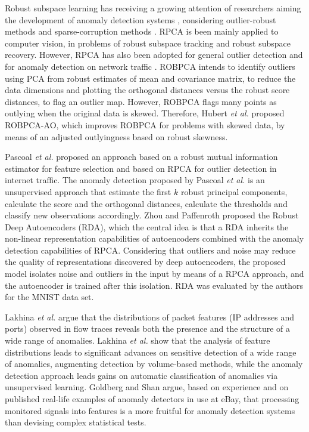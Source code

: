\documentclass[review]{elsarticle}
\begin{document}
Robust subspace learning has receiving a growing attention of researchers aiming the development of anomaly detection systems \cite{rousseeuw1984mcd, rousseeuw1999fastmcd}, considering outlier-robust methods and sparse-corruption methods \cite{lerman2018overview}. RPCA is been mainly applied to computer vision, in problems of robust subspace tracking and robust subspace recovery. However, RPCA has also been adopted for general outlier detection \cite{hubert2005robpca,hubert2009robustskewed,cherapanamjeri2017thresholding,zhou2017anomaly,NetflixSurus} and for anomaly detection on network traffic \cite{pascoal2012robust}. ROBPCA \cite{hubert2005robpca} intends to identify outliers using PCA from robust estimates of mean and covariance matrix, to reduce the data dimensions and plotting the orthogonal distances versus the robust score distances, to flag an outlier map. However, ROBPCA flags many points as outlying when the original data is skewed. Therefore, Hubert \emph{et al.} \cite{hubert2009robustskewed} proposed ROBPCA-AO, which improves ROBPCA for problems with skewed data, by means of an adjusted outlyingness based on robust skewness. 

Pascoal \emph{et al.} \cite{pascoal2012robust} proposed an approach based on a robust mutual information estimator for feature selection and based on RPCA for outlier detection in internet traffic. The anomaly detection proposed by Pascoal \emph{et al.} is an unsupervised approach that estimate the first $k$ robust principal components, calculate the score and the orthogonal distances, calculate the thresholds and classify new observations accordingly. 	Zhou and Paffenroth \cite{zhou2017anomaly} proposed the Robust Deep Autoencoders (RDA), which the central idea is that a RDA inherits the non-linear representation capabilities of autoencoders combined with the anomaly detection capabilities of RPCA. Considering that outliers and noise may reduce the quality of representations discovered by deep autoencoders, the proposed model isolates noise and outliers in the input by means of a RPCA approach, and the autoencoder is trained after this isolation. RDA was evaluated by the authors for the MNIST data set.

Lakhina \emph{et al.} \cite{lakhina2005mining} argue that the distributions of packet features (IP addresses and ports) observed in flow traces reveals both the presence and the structure of a wide range of anomalies. Lakhina \emph{et al.} show that the analysis of feature distributions leads to significant advances on sensitive detection of a wide range of anomalies, augmenting detection by volume-based methods, while the anomaly detection approach leads gains on automatic classification of anomalies via unsupervised learning. Goldberg and Shan \cite{goldberg2015importance} argue, based on experience and on published real-life examples of anomaly detectors in use at eBay, that processing monitored signals into features is a more fruitful for anomaly detection systems than devising complex statistical tests.
\end{document}
